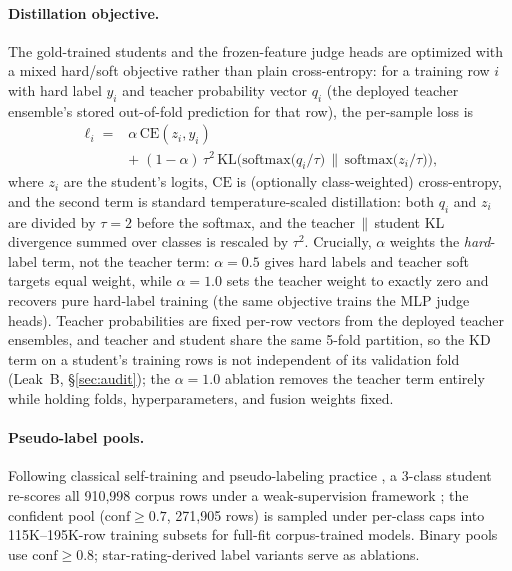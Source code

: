 \paragraph{Distillation objective.} The gold-trained students and the
frozen-feature judge heads are optimized with a mixed hard/soft
objective \citep{hinton2015distilling} rather than plain
cross-entropy: for a training row $i$ with hard label $y_i$ and
teacher probability vector $q_i$ (the deployed teacher ensemble's
stored out-of-fold prediction for that row), the per-sample loss is
{\small
\begin{equation}
  \begin{aligned}
  \ell_i = {}& \alpha\,\mathrm{CE}(z_i, y_i) \\
             & +\; (1-\alpha)\,\tau^{2}\,
  \mathrm{KL}\!\Big(\mathrm{softmax}\big(q_i/\tau\big)\,\Big\|\,
  \mathrm{softmax}\big(z_i/\tau\big)\Big),
  \end{aligned}
  \label{eq:kd}
\end{equation}
}
where $z_i$ are the student's logits, $\mathrm{CE}$ is (optionally
class-weighted) cross-entropy, and the second term is standard
temperature-scaled distillation: both $q_i$ and $z_i$ are divided by
$\tau{=}2$ before the softmax, and the teacher$\,\|\,$student KL
divergence summed over classes is rescaled by $\tau^{2}$. Crucially,
$\alpha$ weights the \emph{hard}-label term, not the teacher term:
$\alpha{=}0.5$ gives hard labels and teacher soft targets equal
weight, while $\alpha{=}1.0$ sets the teacher weight to exactly zero
and recovers pure hard-label training (the same objective trains the
MLP judge heads). Teacher probabilities are fixed per-row vectors
from the deployed teacher ensembles, and teacher and student share
the same 5-fold partition, so the KD term on a student's training
rows is not independent of its validation fold (Leak~B,
\S\ref{sec:audit}); the $\alpha{=}1.0$ ablation removes the teacher
term entirely while holding folds, hyperparameters, and fusion
weights fixed.

\paragraph{Pseudo-label pools.} Following classical self-training and
pseudo-labeling practice \citep{lee2013pseudo,xie2020selftraining}, a
3-class student re-scores all 910{,}998 corpus rows under a
weak-supervision framework \citep{ratner2017snorkel}; the confident
pool ($\mathrm{conf}{\ge}0.7$, 271{,}905 rows) is sampled under
per-class caps into 115K--195K-row training subsets for full-fit
corpus-trained models. Binary pools use $\mathrm{conf}{\ge}0.8$;
star-rating-derived label variants serve as ablations.

